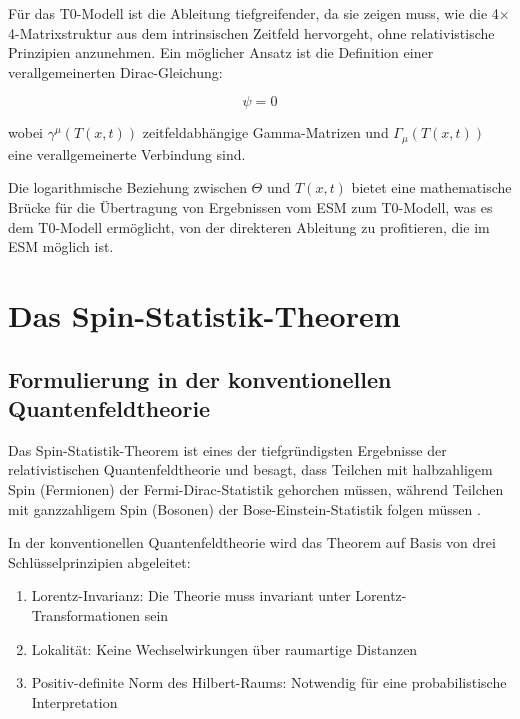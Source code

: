 \documentclass[12pt,a4paper]{article}
\newcommand{\Tfieldt}{T(x,t)}
\begin{document}
	Für das T0-Modell ist die Ableitung tiefgreifender, da sie zeigen muss, wie die 4$\times$4-Matrixstruktur aus dem intrinsischen Zeitfeld hervorgeht, ohne relativistische Prinzipien anzunehmen. Ein möglicher Ansatz ist die Definition einer verallgemeinerten Dirac-Gleichung:
	
	\begin{equation}
		[i\gamma^{\mu}(\Tfieldt)(\partial_{\mu} + \Gamma_{\mu}(\Tfieldt)) - m]\psi = 0
		\label{eq:t0_dirac}
	\end{equation}
	
	wobei $\gamma^{\mu}(\Tfieldt)$ zeitfeldabhängige Gamma-Matrizen und $\Gamma_{\mu}(\Tfieldt)$ eine verallgemeinerte Verbindung sind.
	
	Die logarithmische Beziehung zwischen $\Theta$ und $\Tfieldt$ bietet eine mathematische Brücke für die Übertragung von Ergebnissen vom ESM zum T0-Modell, was es dem T0-Modell ermöglicht, von der direkteren Ableitung zu profitieren, die im ESM möglich ist.
	
	\section{Das Spin-Statistik-Theorem}
	\label{sec:spin_statistics}
	
	\subsection{Formulierung in der konventionellen Quantenfeldtheorie}
	\label{subsec:conventional_formulation}
	
	Das Spin-Statistik-Theorem ist eines der tiefgründigsten Ergebnisse der relativistischen Quantenfeldtheorie und besagt, dass Teilchen mit halbzahligem Spin (Fermionen) der Fermi-Dirac-Statistik gehorchen müssen, während Teilchen mit ganzzahligem Spin (Bosonen) der Bose-Einstein-Statistik folgen müssen \cite{pauli1940}.
	
	In der konventionellen Quantenfeldtheorie wird das Theorem auf Basis von drei Schlüsselprinzipien abgeleitet:
	
	\begin{enumerate}
		\item Lorentz-Invarianz: Die Theorie muss invariant unter Lorentz-Transformationen sein
		\item Lokalität: Keine Wechselwirkungen über raumartige Distanzen
		\item Positiv-definite Norm des Hilbert-Raums: Notwendig für eine probabilistische Interpretation
	\end{enumerate}
	
\end{document}
